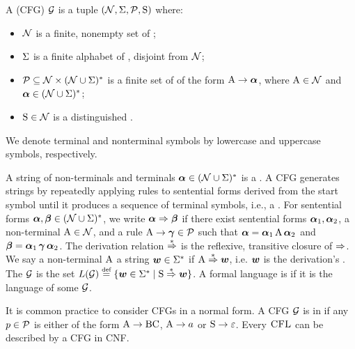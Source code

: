 \documentclass{article}
\begin{document}
\begin{definition}\label{def:cfg}
    A  (CFG) ${{ \mathcal{G}}}$ is a tuple $\cfgtuple$ where:
    \begin{itemize}[noitemsep,topsep=0pt,leftmargin=15pt,parsep=0pt,partopsep=0pt]
        \item ${{ \mathcal{N}}}$ is a finite, nonempty set of ;
        \item ${{ \Sigma}}$ is a finite alphabet of , disjoint from ${{ \mathcal{N}}}$;
        \item ${{ \mathcal{P}}} \subseteq {{ \mathcal{N}}} \times {{({{ \mathcal{N}}}\cup {{ \Sigma}})^*}}$ is a finite set of  of the form ${{ {{ \mathrm{A}}} \rightarrow {{ {{\boldsymbol{\alpha}}}}}}}$, where ${{ \mathrm{A}}} \in {{ \mathcal{N}}}$ and ${{ {{\boldsymbol{\alpha}}}}} \in {{({{ \mathcal{N}}}\cup {{ \Sigma}})^*}}$;
        \item ${{ \mathrm{S}}} \in {{ \mathcal{N}}}$ is a distinguished .
    \end{itemize}
    We denote terminal and nonterminal symbols by lowercase and uppercase symbols, respectively.
\end{definition}
A string of non-terminals and terminals ${{ {{\boldsymbol{\alpha}}}}} \in {{({{ \mathcal{N}}}\cup {{ \Sigma}})^*}}$ is a .
A CFG generates strings by repeatedly applying rules to sentential forms derived from the start symbol until it produces a sequence of terminal symbols, i.e., a . 
For sentential forms ${{ {{\boldsymbol{\alpha}}}}}, {{ {{\boldsymbol{\beta}}}}} \in {{({{ \mathcal{N}}}\cup {{ \Sigma}})^*}}$, we write ${{ {{\boldsymbol{\alpha}}}}} \mathrel{{\Rightarrow}} {{ {{\boldsymbol{\beta}}}}}$ if there exist sentential forms ${{ {{\boldsymbol{\alpha}}}}}_1, {{ {{\boldsymbol{\alpha}}}}}_2$, a non-terminal ${{ \mathrm{A}}} \in {{ \mathcal{N}}}$, and a rule ${{ {{ \mathrm{A}}} \rightarrow {{ {{\boldsymbol{\gamma}}}}}}} \in {{ \mathcal{P}}}$ such that ${{ {{\boldsymbol{\alpha}}}}} = {{ {{\boldsymbol{\alpha}}}}}_1 \, {{ \mathrm{A}}} \, {{ {{\boldsymbol{\alpha}}}}}_2$ and ${{ {{\boldsymbol{\beta}}}}} = {{ {{\boldsymbol{\alpha}}}}}_1 \, {{ {{\boldsymbol{\gamma}}}}} \, {{ {{\boldsymbol{\alpha}}}}}_2$. The derivation relation $\mathrel{{\overset{*}{\Rightarrow}}}$ is the reflexive, transitive closure of $\mathrel{{\Rightarrow}}$.
We say a non-terminal ${{ \mathrm{A}}}$  a string ${{\boldsymbol{w}}} \in {{{{ \Sigma}}^*}}$ if ${{ \mathrm{A}}} \mathrel{{\overset{*}{\Rightarrow}}} {{\boldsymbol{w}}}$, i.e. ${{\boldsymbol{w}}}$ is the derivation's .
The  ${{ \mathcal{G}}}$ is the set $\lang(\grammar) \defeq \{\str \in \kleene{\alphabet} \mid \start \derives \str\}$.
A formal language is  if it is the language of some ${{ \mathcal{G}}}$.

It is common practice to consider CFGs in a normal form.
A CFG ${{ \mathcal{G}}}$ is in  if any ${{ p}} \in {{ \mathcal{P}}}$ is either of the form ${{ {{ \mathrm{A}}} \rightarrow {{ \mathrm{B}}} {{ \mathrm{C}}}}}$, ${{ {{ \mathrm{A}}} \rightarrow {{a}}}}$ or ${{ {{ \mathrm{S}}} \rightarrow {{ \varepsilon}}}}$.
Every ${\textsc{CFL}}$ can be described by a CFG in CNF.
\end{document}
